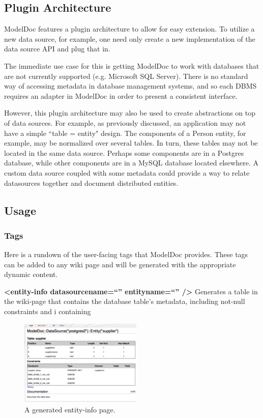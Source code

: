 \documentclass{acm_proc_article-sp}
\begin{document}
\subsection{Plugin Architecture}

ModelDoc features a plugin architecture to allow for easy extension.  To
utilize a new data source, for example, one need only create a new
implementation of the data source API and plug that in.

The immediate use case for this is getting ModelDoc to work with databases that
are not currently supported (e.g. Microsoft SQL Server).  There is no standard
way of accessing metadata in database management systems, and so each DBMS requires an adapter in ModelDoc
in order to present a consistent interface.

However, this plugin architecture may also be used to create abstractions on
top of data sources.  For example, as previously discussed, an application
may not have a simple ``table = entity" design.  The components of a Person
entity, for example, may be normalized over several tables.  In turn, these
tables may not be located in the same data source.  Perhaps some components are
in a Postgres database, while other components are in a MySQL database located
elsewhere.  A custom data source coupled with some metadata could provide a way
to relate datasources together and document distributed entities.

\subsection{Usage}

\subsubsection{Tags}
Here is a rundown of the user-facing tags that ModelDoc provides.  These tags
can be added to any wiki page and will be generated with the appropriate
dynamic content.

\textbf{<entity-info datasourcename=``'' entityname=``'' />}
Generates a table in the wiki-page that contains the database table's metadata,
including not-null constraints and i containing

\begin{figure}[ht]
\centering
\includegraphics[width=220px]{entity-info.pdf}
\caption{A generated entity-info page.}
\end{figure}
\end{document}
